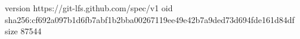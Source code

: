 version https://git-lfs.github.com/spec/v1
oid sha256:cf692a097b1d6fb7abf1b2bba00267119ee49e42b7a9ded73d694fde161d84df
size 87544
